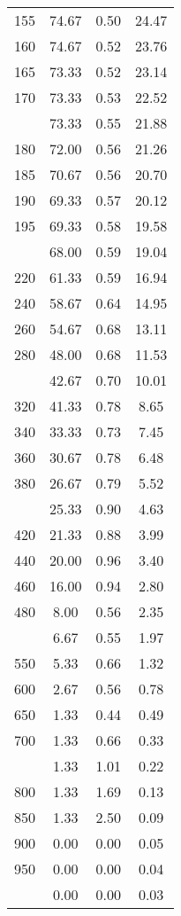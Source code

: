 \begin{table}[ht]
\begin{tabular}{lccc}
  155 & 74.67 & 0.50 & 24.47 \\ 
  160 & 74.67 & 0.52 & 23.76 \\ 
  165 & 73.33 & 0.52 & 23.14 \\ 
  170 & 73.33 & 0.53 & 22.52 \\ 
   \addlinespace
175 & 73.33 & 0.55 & 21.88 \\ 
  180 & 72.00 & 0.56 & 21.26 \\ 
  185 & 70.67 & 0.56 & 20.70 \\ 
  190 & 69.33 & 0.57 & 20.12 \\ 
  195 & 69.33 & 0.58 & 19.58 \\ 
   \addlinespace
200 & 68.00 & 0.59 & 19.04 \\ 
  220 & 61.33 & 0.59 & 16.94 \\ 
  240 & 58.67 & 0.64 & 14.95 \\ 
  260 & 54.67 & 0.68 & 13.11 \\ 
  280 & 48.00 & 0.68 & 11.53 \\ 
   \addlinespace
300 & 42.67 & 0.70 & 10.01 \\ 
  320 & 41.33 & 0.78 & 8.65 \\ 
  340 & 33.33 & 0.73 & 7.45 \\ 
  360 & 30.67 & 0.78 & 6.48 \\ 
  380 & 26.67 & 0.79 & 5.52 \\ 
   \addlinespace
400 & 25.33 & 0.90 & 4.63 \\ 
  420 & 21.33 & 0.88 & 3.99 \\ 
  440 & 20.00 & 0.96 & 3.40 \\ 
  460 & 16.00 & 0.94 & 2.80 \\ 
  480 & 8.00 & 0.56 & 2.35 \\ 
   \addlinespace
500 & 6.67 & 0.55 & 1.97 \\ 
  550 & 5.33 & 0.66 & 1.32 \\ 
  600 & 2.67 & 0.56 & 0.78 \\ 
  650 & 1.33 & 0.44 & 0.49 \\ 
  700 & 1.33 & 0.66 & 0.33 \\ 
   \addlinespace
750 & 1.33 & 1.01 & 0.22 \\ 
  800 & 1.33 & 1.69 & 0.13 \\ 
  850 & 1.33 & 2.50 & 0.09 \\ 
  900 & 0.00 & 0.00 & 0.05 \\ 
  950 & 0.00 & 0.00 & 0.04 \\ 
   \addlinespace
1000 & 0.00 & 0.00 & 0.03 \\ 
   \bottomrule
\end{tabular}
\end{table}
